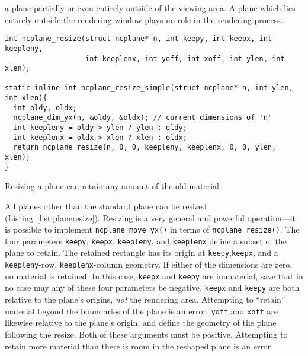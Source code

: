 a plane partially or even entirely outside of the viewing area. A plane which
lies entirely outside the rendering window plays no role in the rendering
process.
\begin{listing}[!htb]
\begin{verbatim}
int ncplane_resize(struct ncplane* n, int keepy, int keepx, int keepleny,
                   int keeplenx, int yoff, int xoff, int ylen, int xlen);

static inline int ncplane_resize_simple(struct ncplane* n, int ylen, int xlen){
  int oldy, oldx;
  ncplane_dim_yx(n, &oldy, &oldx); // current dimensions of 'n'
  int keepleny = oldy > ylen ? ylen : oldy;
  int keeplenx = oldx > xlen ? xlen : oldx;
  return ncplane_resize(n, 0, 0, keepleny, keeplenx, 0, 0, ylen, xlen);
}
\end{verbatim}
\caption{Resizing a plane can retain any amount of the old material.}
\label{list:planeresize}
\end{listing}
All planes other than the standard plane can be resized (Listing~\ref{list:planeresize}).
Resizing is a very general and powerful operation---it is possible to implement
\texttt{ncplane\_move\_yx()} in terms of \texttt{ncplane\_resize()}. The four
parameters \texttt{keepy}, \texttt{keepx}, \texttt{keepleny}, and
\texttt{keeplenx} define a subset of the plane to retain. The retained
rectangle has its origin at \texttt{keepy},\texttt{keepx}, and a
\texttt{keepleny}-row, \texttt{keeplenx}-column geometry. If either of the
dimensions are zero, no material is retained. In this case, \texttt{keepx} and
\texttt{keepy} are immaterial, save that in no case may any of these four
parameters be negative. \texttt{keepx} and \texttt{keepy} are both relative to
the plane's origins, \textit{not} the rendering area. Attempting to ``retain''
material beyond the boundaries of the plane is an error. \texttt{yoff} and
\texttt{xoff} are likewise relative to the plane's origin, and define the
geometry of the plane following the resize. Both of these arguments must be
positive. Attempting to retain more material than there is room in the reshaped
plane is an error.

